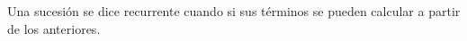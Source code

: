 Una sucesión se dice recurrente cuando si sus términos se pueden calcular a partir de los anteriores.